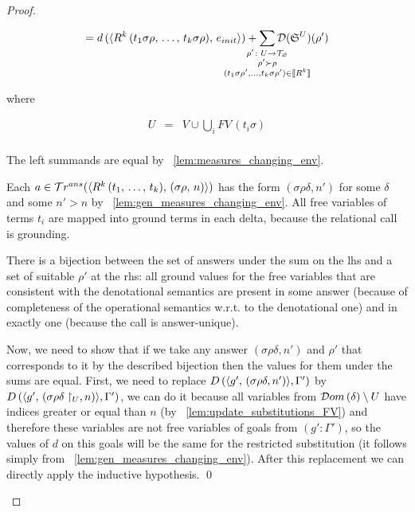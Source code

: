 \begin{proof}
\begin{enumerate}
\begin{enumerate}
	\[ = d\,(\taskst{\invokegoal{R^k}{t_1 \sigma \rho}{t_k \sigma \rho}}{e_{init}}) +
      \smashoperator{\sum\limits_{\substack{ \rho' \colon U \to \grterms \\
                                      \rho' \succ \rho \\
                                      (t_1 \sigma \rho', \dots, t_k \sigma \rho') \in \sembr{R^k}  }}}
           \mathcal{D}(\schemewithvset{\mathfrak{S}}{U})(\rho')  \]
           
    where
    
    \[ \begin{array}{lcl}
    U & = &  V \cup \bigcup_{i} FV\,(t_i \sigma) \\
    \end{array} \]
    
    The left summands are equal by \lemmaword~\ref{lem:measures_changing_env}.
    
    Each $a \in \mathcal{T}r^{ans}(\langle R^k\,(t_1, \, \dots, \, t_k) ,\, (\sigma\rho ,\, n) \rangle)$ has the form $(\sigma \rho \delta, n')$ for some $\delta$ and some $n' > n$ by \lemmaword~\ref{lem:gen_measures_changing_env}. All free variables of terms $t_i$ are mapped into ground terms in each delta, because the relational call is grounding.
    
    There is a bijection between the set of answers under the sum on the lhs and a set of suitable $\rho'$ at the rhs: all ground values for the free variables that are consistent with the denotational semantics are present in some answer (because of completeness of the operational semantics w.r.t. to the denotational one) and in exactly one (because the call is answer-unique).
    
    Now, we need to show that if we take any answer $(\sigma \rho \delta, n')$ and $\rho'$ that corresponds to it by the described bijection then the values for them under the sums are equal. First, we need to replace $D\,(\langle g' ,\, (\sigma \rho \delta, n') \rangle, \Gamma')$ by $D\,(\langle g' ,\, (\sigma \rho \delta\restriction_U, n) \rangle, \Gamma')$, we can do it because all variables from $\mathcal{D}om\,(\delta) \setminus U$ have indices greater or equal than $n$ (by \lemmaword~\ref{lem:update_substitutions_FV}) and therefore these variables are not free variables of goals from $(g' : \Gamma')$, so the values of $d$ on this goals will be the same for the restricted substitution (it follows simply from \lemmaword~\ref{lem:gen_measures_changing_env}). After this replacement we can directly apply the inductive hypothesis.
    \qed
	
	\end{enumerate}


\end{enumerate}
\end{proof}

